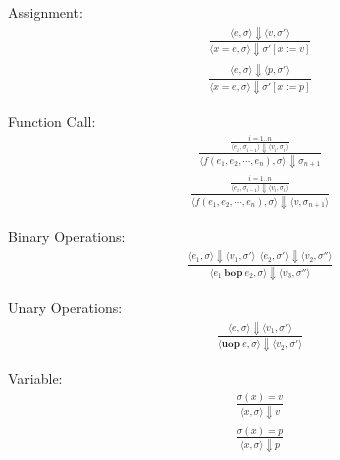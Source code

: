 \documentclass[12pt]{article}
\begin{document}
	Assignment:
	\begin{align*}
		\frac{\langle e, \sigma \rangle\Downarrow \langle v, \sigma' \rangle}
		{\langle x = e, \sigma \rangle\Downarrow \sigma' [x := v]}
	\end{align*}
	\begin{align*}
		\frac{\langle e, \sigma \rangle\Downarrow \langle p, \sigma' \rangle}
		{\langle x = e, \sigma \rangle\Downarrow \sigma' [x := p]}
	\end{align*}

	Function Call:
	\begin{align*}
		\frac{
			\frac{i = 1..n}
			{\langle e_i, \sigma_{i-1} \rangle\Downarrow \langle v_i, \sigma_i \rangle}
		}
		{\langle f(e_1, e_2, \cdots, e_n), \sigma \rangle\Downarrow \sigma_{n + 1}}
	\end{align*}
	\begin{align*}
		\frac{
			\frac{i = 1..n}
			{\langle e_i, \sigma_{i-1} \rangle\Downarrow \langle v_i, \sigma_i \rangle}
		}
		{\langle f(e_1, e_2, \cdots, e_n), \sigma \rangle\Downarrow \langle v, \sigma_{n + 1} \rangle}
	\end{align*}


	Binary Operations:
	\begin{align*}
		\frac{\langle e_1, \sigma \rangle\Downarrow \langle v_1, \sigma' \rangle \ \
		\langle e_2, \sigma' \rangle\Downarrow \langle v_2, \sigma'' \rangle}
		{\langle e_1\ \textbf{bop}\ e_2, \sigma \rangle\Downarrow \langle v_3, \sigma'' \rangle}
	\end{align*}
	
	Unary Operations:
	\begin{align*}
		\frac{\langle e, \sigma \rangle\Downarrow \langle v_1, \sigma' \rangle}
		{\langle \textbf{uop}\ e, \sigma \rangle\Downarrow \langle v_2, \sigma' \rangle}
	\end{align*}

	Variable:
	\begin{align*}
		\frac{\sigma(x) = v}
		{\langle x, \sigma \rangle\Downarrow v}
	\end{align*}
	\begin{align*}
		\frac{\sigma(x) = p}
		{\langle x, \sigma \rangle\Downarrow p}
	\end{align*}
\end{document}
